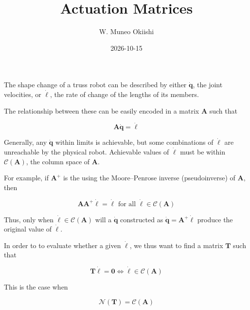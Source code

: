 \documentclass[11pt]{article}
\title{Actuation Matrices}
\author{W. Muneo Okiishi}
\date{2026-10-15}
\begin{document}
\maketitle

The shape change of a truss robot can be described by either
$\dot{\mathbf{q}}$, the joint velocities, or $\dot{\boldsymbol{\ell}}$,
the rate of change of the lengths of its members.

The relationship between these can be easily encoded in a matrix $\mathbf{A}$
such that

\begin{equation}
    \mathbf{A} \dot{\mathbf{q}} = \dot{\boldsymbol{\ell}}
\end{equation}

Generally, any $\dot{\mathbf{q}}$ within limits is achievable, but some
combinations of $\dot{\boldsymbol{\ell}}$ are unreachable by the physical
robot. Achievable values of $\dot{\boldsymbol{\ell}}$ must be within
$\mathcal{C}(\mathbf{A})$, the column space of $\mathbf{A}$.

For example, if $\mathbf{A}^+$ is the using the Moore--Penrose inverse
(pseudoinverse) of $\mathbf{A}$, then

\begin{equation}
    \mathbf{A} \mathbf{A}^+ \dot{\boldsymbol{\ell}} = \dot{\boldsymbol{\ell}}
    \text{ for all } \dot{\boldsymbol{\ell}} \in \mathcal{C}(\mathbf{A})
\end{equation}

Thus, only when $\dot{\boldsymbol{\ell}} \in \mathcal{C}(\mathbf{A})$ will a
$\dot{\mathbf{q}}$ constructed as $\dot{\mathbf{q}} = \mathbf{A}^+ \dot{\boldsymbol{\ell}}$
produce the original value of $\dot{\boldsymbol{\ell}}$.

In order to to evaluate whether a given $\dot{\boldsymbol{\ell}}$, we thus
want to find a matrix $\mathbf{T}$ such that

\begin{equation}
    \mathbf{T} \dot{\boldsymbol{\ell}} = \mathbf{0}
    \iff \dot{\boldsymbol{\ell}} \in \mathcal{C}(\mathbf{A})
\end{equation}

This is the case when

\begin{equation}
    \mathcal{N}(\mathbf{T}) = \mathcal{C}(\mathbf{A})
\end{equation}
\end{document}
